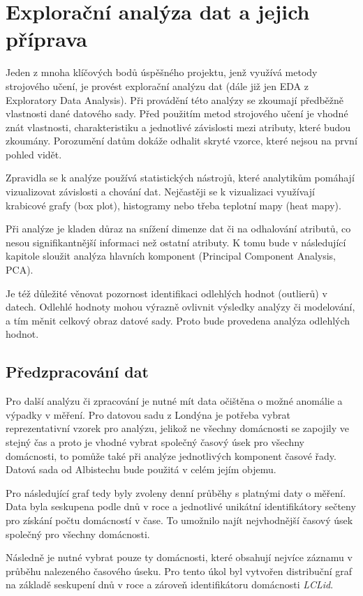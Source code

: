\documentclass[FM,BP,fonts]{tulthesis}
\begin{document}
\section{Explorační analýza dat a jejich příprava}
Jeden z mnoha klíčových bodů úspěšného projektu, jenž využívá metody strojového učení, je provést explorační analýzu dat (dále již jen EDA z Exploratory Data Analysis). Při provádění této analýzy se zkoumají předběžně vlastnosti dané datového sady. Před použitím metod strojového učení je vhodné znát vlastnosti, charakteristiku a jednotlivé závislosti mezi atributy, které budou zkoumány. Porozumění datům dokáže odhalit skryté vzorce, které nejsou na první pohled vidět.

Zpravidla se k analýze používá statistických nástrojů, které analytikům pomáhají vizualizovat závislosti a chování dat. Nejčastěji se k vizualizaci využívají krabicové grafy (box plot), histogramy nebo třeba teplotní mapy (heat mapy). 

Při analýze je kladen důraz na snížení dimenze dat či na odhalování atributů, co nesou signifikantnější informaci než ostatní atributy. K tomu bude v následující kapitole sloužit analýza hlavních komponent (Principal Component Analysis, PCA). 

Je též důležité věnovat pozornost identifikaci odlehlých hodnot (outlierů) v datech. Odlehlé hodnoty mohou výrazně ovlivnit výsledky analýzy či modelování, a tím měnit celkový obraz datové sady. Proto bude provedena analýza odlehlých hodnot.


\subsection{Předzpracování dat}
Pro další analýzu či zpracování je nutné mít data očištěna o možné anomálie a výpadky v měření. Pro datovou sadu z Londýna je potřeba vybrat reprezentativní vzorek pro analýzu, jelikož ne všechny domácnosti se zapojily ve stejný čas a proto je vhodné vybrat společný časový úsek pro všechny domácnosti, to pomůže také při analýze jednotlivých komponent časové řady. Datová sada od Albistechu bude použitá v celém jejím objemu. 

Pro následující graf tedy byly zvoleny denní průběhy s platnými daty o měření. Data byla seskupena podle dnů v roce a jednotlivé unikátní identifikátory sečteny pro získání počtu domácností v čase. To umožnilo najít nejvhodnější časový úsek společný pro všechny domácnosti.

Následně je nutné vybrat pouze ty domácnosti, které obsahují nejvíce záznamu v průběhu nalezeného časového úseku. Pro tento úkol byl vytvořen distribuční graf na základě seskupení dnů v roce a zároveň identifikátoru domácnosti \textit{LCLid}.
\end{document}

